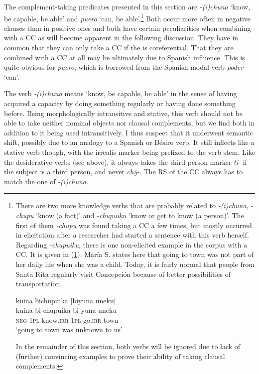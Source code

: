 The complement-taking predicates presented in this section are \textit{-(i)chuna} ‘know, be capable, be able’ and \textit{puero} ‘can, be able’.\footnote{There are two more knowledge verbs that are probably related to \textit{-(i)chuna}, \textit{-chupu} ‘know (a fact)’ and \textit{-chupuiku} ‘know or get to know (a person)’. The first of them \textit{-chupu} was found taking a CC a few times, but mostly occurred in elicitation after a researcher had started a sentence with this verb herself. Regarding \textit{-chupuiku}, there is one non-elicited example in the corpus with a CC. It is given in (\ref{ex:know-town}). María S. states here that going to town was not part of her daily life when she was a child. Today, it is fairly normal that people from Santa Rita regularly visit Concepción because of better possibilities of transportation. 

\ea\label{ex:know-town}
\begingl
\glpreamble kuina bichupuika \textup{[}biyuna uneku\textup{]}\\
\gla kuina bi-chupuika bi-yuna uneku\\
\glb \textsc{neg} 1\textsc{pl}-know.\textsc{irr} 1\textsc{pl}-go.\textsc{irr} town\\
\glft ‘going to town was unknown to us’
\endgl
\trailingcitation{[rxx-p181101l-2.164]}
\xe

In the remainder of this section, both verbs will be ignored due to lack of (further) convincing examples to prove their ability of taking clausal complements.}
 Both occur more often in negative clauses than in positive ones and both have certain peculiarities when combining with a CC as will become apparent in the following discussion. They have in common that they can only take a CC if the  is coreferential. That they are combined with a CC at all may be ultimately due to Spanish influence. This is quite obvious for \textit{puero}, which is borrowed from the Spanish modal verb \textit{poder} ‘can’.
  
The verb \textit{-(i)chuna} means ‘know, be capable, be able’ in the sense of having acquired a capacity by doing something regularly or having done something before. Being morphologically intransitive and stative,  this verb should not be able to take neither nominal objects nor clausal complements, but we find both in addition to it being used intransitively. I thus suspect that it underwent semantic shift, possibly due to an analogy to a Spanish or Bésiro verb. It still inflects like a stative verb though, with the irrealis marker being prefixed to the verb stem. Like the desiderative verbs (see  above), it always takes the third person marker \textit{ti-} if the subject is a third person, and never \textit{chÿ-}. The RS of the CC always has to match the one of \textit{-(i)chuna}.

